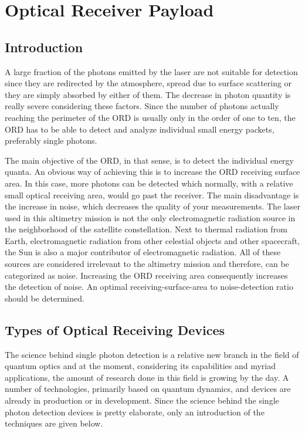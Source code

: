 \section{Optical Receiver Payload}
	\label{blDOreceiver}
		\subsection{Introduction}
A large fraction of the photons emitted by the \acs{laser} are not suitable for detection since they are redirected by the atmosphere, spread due to surface scattering or they are simply absorbed by either of them. The decrease in photon quantity is really severe considering these factors. Since the number of photons actually reaching the perimeter of the \ac{ORD} is usually only in the order of one to ten, the \acs{ORD} has to be able to detect and analyze individual small energy packets, preferably single photons. 

The main objective of the \acs{ORD}, in that sense, is to detect the individual energy quanta. An obvious way of achieving this is to increase the \acs{ORD} receiving surface area. In this case, more photons can be detected which normally, with a relative small optical receiving area, would go past the receiver. The main disadvantage is the increase in noise, which decreases the quality of your measurements. The \acs{laser} used in this altimetry mission is not the only electromagnetic radiation source in the neighborhood of the satellite constellation. Next to thermal radiation from Earth, electromagnetic radiation from other celestial objects and other spacecraft, the Sun is also a major contributor of electromagnetic radiation. All of these sources are considered irrelevant to the altimetry mission and therefore, can be categorized as noise. Increasing the \acs{ORD} receiving area consequently increases the detection of noise. An optimal receiving-surface-area to noise-detection ratio should be determined.

\subsection{Types of Optical Receiving Devices}
	\label{blDOtypesORD}
The science behind single photon detection is a relative new branch in the field of quantum optics and at the moment, considering its capabilities and myriad applications, the amount of research done in this field is growing by the day. A number of technologies, primarily based on quantum dynamics, and devices are already in production or in development. Since the science behind the single photon detection devices is pretty elaborate, only an introduction of the techniques are given below.

